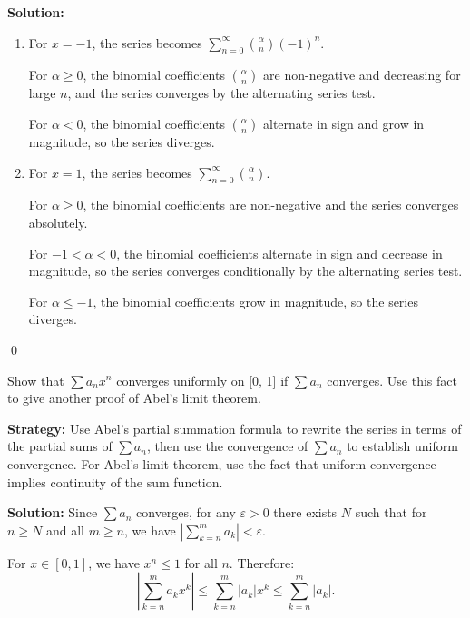 \bigskip\noindent\textbf{Solution:}
\begin{enumerate}[label=(\alph*)]
\item For \( x = -1 \), the series becomes \( \sum_{n=0}^\infty \binom{\alpha}{n} (-1)^n \).

For \( \alpha \geq 0 \), the binomial coefficients \( \binom{\alpha}{n} \) are non-negative and decreasing for large \( n \), and the series converges by the alternating series test.

For \( \alpha < 0 \), the binomial coefficients \( \binom{\alpha}{n} \) alternate in sign and grow in magnitude, so the series diverges.

\item For \( x = 1 \), the series becomes \( \sum_{n=0}^\infty \binom{\alpha}{n} \).

For \( \alpha \geq 0 \), the binomial coefficients are non-negative and the series converges absolutely.

For \( -1 < \alpha < 0 \), the binomial coefficients alternate in sign and decrease in magnitude, so the series converges conditionally by the alternating series test.

For \( \alpha \leq -1 \), the binomial coefficients grow in magnitude, so the series diverges.
\end{enumerate}\qed


\begin{problembox}
\begin{problemstatement}
Show that \( \sum a_n x^n \) converges uniformly on [0, 1] if \( \sum a_n \) converges. Use this fact to give another proof of Abel's limit theorem.
\end{problemstatement}
\end{problembox}

\noindent\textbf{Strategy:} Use Abel's partial summation formula to rewrite the series in terms of the partial sums of \( \sum a_n \), then use the convergence of \( \sum a_n \) to establish uniform convergence. For Abel's limit theorem, use the fact that uniform convergence implies continuity of the sum function.

\bigskip\noindent\textbf{Solution:} Since \( \sum a_n \) converges, for any \( \varepsilon > 0 \) there exists \( N \) such that for \( n \geq N \) and all \( m \geq n \), we have \( |\sum_{k=n}^m a_k| < \varepsilon \).

For \( x \in [0, 1] \), we have \( x^n \leq 1 \) for all \( n \). Therefore:
\[\left|\sum_{k=n}^m a_k x^k\right| \leq \sum_{k=n}^m |a_k| x^k \leq \sum_{k=n}^m |a_k|.\]

